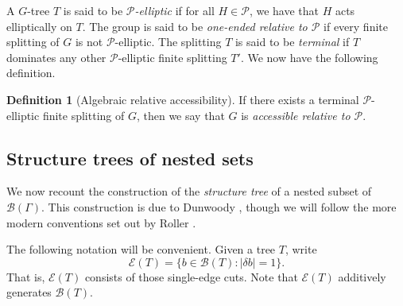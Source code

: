 \documentclass[11pt,a4paper]{amsart}
\theoremstyle{definition}
\newtheorem{definition}[theorem]{Definition}
\newcommand{\br}{{\mathscr{B}}}
\begin{document}
A $G$-tree $T$ is said to be \emph{$\mathcal P$-elliptic} if for all $H \in \mathcal P$, we have that $H$ acts elliptically on $T$. 
The group is said to be \emph{one-ended relative to $\mathcal P$} if every finite splitting of $G$ is not $\mathcal P$-elliptic. 
The splitting $T$ is said to be \emph{terminal} if $T$ dominates any other $\mathcal P$-elliptic finite splitting $T'$. We now have the following definition.

\begin{definition}[Algebraic relative accessibility]
    If there exists a terminal $\mathcal P$-elliptic finite splitting of $G$, then we say that $G$ is \emph{accessible relative to $\mathcal P$}. 
\end{definition}




\subsection{Structure trees of nested sets}

We now recount the construction of the \emph{structure tree} of a nested subset of $\br(\Gamma)$. This construction is due to Dunwoody \cite{dunwoody1979accessibility}, though we will follow the more modern conventions set out by Roller \cite{roller-thesis}.

The following notation will be convenient. Given a tree $T$, write 
$$
\mathscr E(T) = \{b \in \br(T) : |\delta b| = 1\}.
$$
That is, $\mathscr E(T)$ consists of those single-edge cuts. Note that $\mathscr E(T)$ additively generates $\br(T)$.
\end{document}
